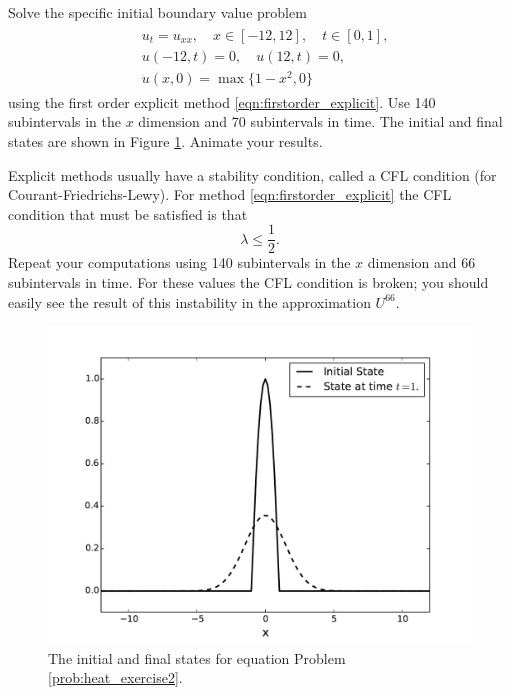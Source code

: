 \begin{problem}
\label{prob:heat_exercise2}
Solve the specific initial boundary value problem
\begin{align}
	\begin{split}
	&{ } u_t = u_{xx}, \quad x \in [-12,12],\quad t \in [0,1], \\
	&{ } u(-12,t) = 0,\quad u(12,t) = 0,\\
	&{ } u(x,0) = \max\{1 - x^2,0\}
	\end{split}
\end{align}
using the first order explicit method \ref{eqn:firstorder_explicit}.
Use 140 subintervals in the $x$ dimension and 70 subintervals in time.
The initial and final states are shown in Figure \ref{fig:heatexercise2}.
Animate your results.

Explicit methods usually have a stability condition, called a CFL condition (for Courant-Friedrichs-Lewy).
For method \ref{eqn:firstorder_explicit} the CFL condition that must be satisfied is that
\[\lambda \leq \frac{1}{2}.\]
Repeat your computations using 140 subintervals in the $x$ dimension and 66 subintervals in time.
For these values the CFL condition is broken; you should easily see the result of this instability in the approximation $U^{66}$.
\end{problem}

\begin{figure}
\centering
\includegraphics[width=\textwidth]{heatexercise2.pdf}
\caption{The initial and final states for equation Problem \ref{prob:heat_exercise2}.}
\label{fig:heatexercise2}
\end{figure}

